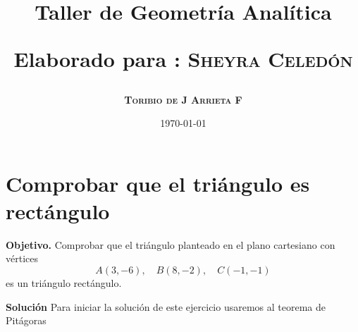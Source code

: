 \documentclass[12pt,a4paper]{article}
\title{\Large Taller de Geometría Analítica
	
\small{Elaborado para : \textsc{\bf{Sheyra Celedón}}}}
\author{\bf{\textsc{Toribio de J Arrieta F}}}
\date{\today}
\begin{document}
	\maketitle
	
\section{Comprobar que el triángulo es rectángulo}
	
	\textbf{Objetivo.} Comprobar que el triángulo planteado en el plano cartesiano con vértices
	\[
	A(3,-6),\quad B(8,-2),\quad C(-1,-1)
	\]
	es un triángulo rectángulo. 
	
	\vspace{5mm}
	
	\textbf{Solución} Para iniciar la solución de este ejercicio usaremos al teorema de Pitágoras
	
	
	\bigskip
	
\end{document}
